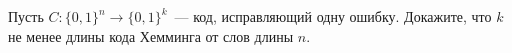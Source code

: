 Пусть $C: \{0, 1\}^n \to \{0, 1\}^k$~--- код, исправляющий одну ошибку. Докажите, что $k$ не менее длины кода Хемминга от
слов длины $n$.